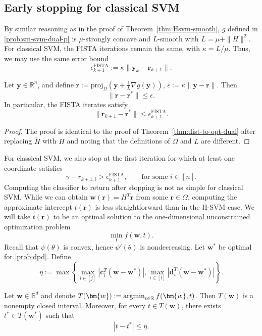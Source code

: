 \documentclass[twoside,11pt]{article}
\newcommand\argmin{\mathop{\rm argmin}}
\newcommand\proj{\mathrm{proj}}
\renewcommand{\c}{\bm{c}}
\renewcommand{\d}{\bm{d}}
\newcommand{\R}{{\mathbb{R}}} %
\renewcommand\r{\bm{r}}
\newcommand\w{\bm{w}}
\newcommand\y{\bm{y}}
\newcommand\tH{\tilde{H}}
\begin{document}
\subsection{Early stopping for classical SVM} \label{app:early-stopping-classic}
By similar reasoning as in the proof of Theorem~\ref{thm:Hsvm-smooth}, $g$ defined in \eqref{prob:sm-svm-dual-p} is $\mu$-strongly concave and $L$-smooth with $L = \mu + \|H\|^2$. For classical SVM, the FISTA iterations remain the same, with $\kappa = L/\mu$. Thus, we may use the same error bound 
\begin{equation*}
    \epsilon_{k+1}^{\mathrm{FISTA}} := \kappa\|\y_k-\r_{k+1}\|.
\end{equation*}

\begin{theorem} \label{thm:Csvm-dist-to-opt-dual}
Let $\y\in\mathbb{R}^n$, and define $\r := \proj_{\Omega}(\y + \frac{1}{L}\nabla g(\y))$, $\epsilon := \kappa \|\y - \r\|$.
Then
\[
    \|\r-\r^*\|\leq\epsilon.
\]
In particular, the FISTA iterates satisfy
\[
    \|\r_{k+1} - \r^*\| \leq \epsilon_{k+1}^{\mathrm{FISTA}}.
\]
\end{theorem}
\begin{proof}
The proof is identical to the proof of Theorem~\ref{thm:dist-to-opt-dual} after replacing $\tH$ with $H$ and noting that the definitions of $\Omega$ and $L$ are different.
\end{proof}
For classical SVM, we also stop at the first iteration for which at least one coordinate satisfies
\begin{equation}
    \gamma-r_{k+1,i} > \epsilon_{k+1}^{\mathrm{FISTA}},\qquad\text{for some $i \in [n]$.}
\end{equation}
Computing the classifier to return after stopping is not as simple for classical SVM. While we can obtain $\w(\r) = H^T\r$ from some $\r \in \Omega$, computing the approximate intercept $t(\r)$ is less straightforward than in the H-SVM case. We will take $t(\r)$ to be an optimal solution to the one-dimensional unconstrained optimization problem
\begin{equation} \label{prob:tprob}
  \min_{t} f(\w,t).
\end{equation}
Recall that $\psi(\theta)$ is convex, hence $\psi'(\theta)$ is nondecreasing. Let $\w^*$ be optimal for \eqref{prob:dpd}. Define
\[
    \eta := \max\left\{\max_{i \in [j]} |\c_i^T(\w - \w^*)|, \max_{i \in [l]} |\d_i^T(\w - \w^*)|\right\}.
\]
\begin{lemma} \label{lem:dist-to-tstar}
    Let $\w \in \R^d$ and denote $T(\w) := \argmin_{t \in \R} f(\w,t)$. Then $T(\w)$ is a nonempty closed interval. Moreover, for every $t \in T(\w)$, there exists $t^* \in T(\w^*)$ such that
    \[
        |t - t^*| \leq \eta.
    \]
\end{lemma}
\end{document}
